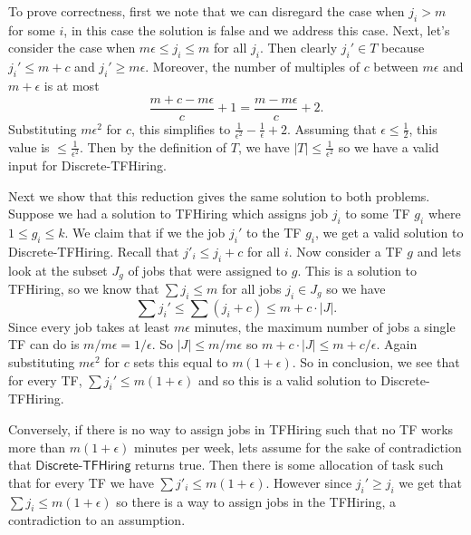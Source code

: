 \documentclass[11pt,letterpaper]{article}
\begin{document}
\begin{solution}
    To prove correctness, first we note that we can disregard the case when $j_i>m$ for some $i$, in this case the solution is false and we address this case. Next, let's consider the case when $m\epsilon \leq j_i \leq m$ for all $j_i$. Then clearly $j_i'\in T$ because $j_i'\leq m+c$ and $j_i'\geq m\epsilon$.  Moreover, the number of multiples of $c$ between $m\epsilon$ and $m+\epsilon$ is at most 
    \[
        \frac{m+c-m\epsilon}{c}+1=\frac{m-m\epsilon}{c}+2.
    \]
    Substituting $m\epsilon^2$ for $c$, this simplifies to $\frac{1}{\epsilon^2}-\frac{1}{\epsilon}+2$. Assuming that $\epsilon\leq \frac12$, this value is $\leq \frac{1}{\epsilon^2}$. Then by the definition of $T$, we have $|T|\leq \frac{1}{\epsilon^2}$ so we have a valid input for \textsf{Discrete-TFHiring}.

    Next we show that this reduction gives the same solution to both problems. Suppose we had a solution to \textsf{TFHiring} which assigns job $j_i$ to some TF $g_i$ where $1\leq g_i\leq k$. We claim that if we the job $j_i'$ to the TF $g_i$, we get a valid solution to \textsf{Discrete-TFHiring}. Recall that $j'_i \leq j_i+c$ for all $i$. Now consider a TF $g$ and lets look at the subset $J_g$ of jobs that were assigned to $g$. This is a solution to \textsf{TFHiring}, so we know that $\sum j_i\leq m$ for all jobs $j_i\in J_g$ so we have
    \[
        \sum j_i' \leq \sum (j_i+c)\leq m+c\cdot |J|.
    \] 
    Since every job takes at least $m\epsilon$ minutes, the maximum number of jobs a single TF can do is $m/m\epsilon = 1/\epsilon$. So $|J|\leq m/m\epsilon$ so $m+c\cdot |J|\leq m + c/\epsilon$. Again substituting $m\epsilon^2$ for $c$ sets this equal to $m(1+\epsilon)$. So in conclusion, we see that for every TF, $\sum j_i'\leq m(1+\epsilon)$ and so this is a valid solution to \textsf{Discrete-TFHiring}.

    Conversely, if there is no way to assign jobs in \textsf{TFHiring} such that no TF works more than $m(1+\epsilon)$ minutes per week, lets assume for the sake of contradiction that $\textsf{Discrete-TFHiring}$ returns true. Then there is some allocation of task such that for every TF we have $\sum j'_i \leq m(1+\epsilon)$. However since $j_i' \geq j_i$ we get that $\sum j_i \leq m(1+\epsilon)$ so there is a way to assign jobs in the \textsf{TFHiring}, a contradiction to an assumption.
\end{solution}
\end{document}
